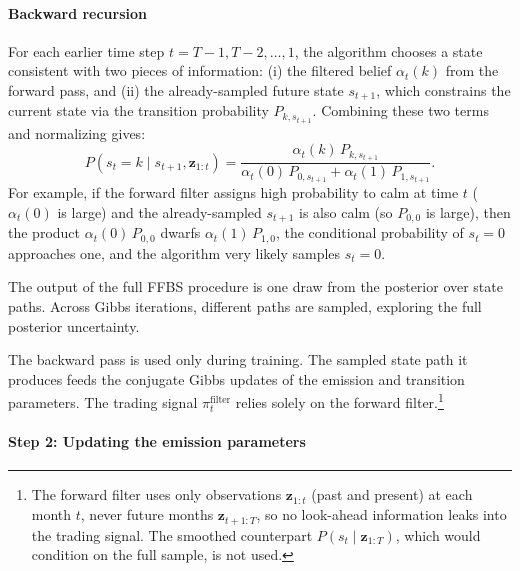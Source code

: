 \paragraph{Backward recursion} For each earlier time step $t = T-1, T-2, \dots, 1$, the algorithm chooses a state consistent with two pieces of information: (i) the filtered belief $\alpha_t(k)$ from the forward pass, and (ii) the already-sampled future state $s_{t+1}$, which constrains the current state via the transition probability $P_{k, s_{t+1}}$. Combining these two terms and normalizing gives:
\begin{equation}
P(s_t = k \mid s_{t+1}, \mathbf{z}_{1:t}) = \frac{\alpha_t(k)\,P_{k,s_{t+1}}}
{\alpha_t(0)\,P_{0,s_{t+1}} + \alpha_t(1)\,P_{1,s_{t+1}}}.
\label{eq:backward_sampling}
\end{equation}
For example, if the forward filter assigns high probability to calm at time $t$ ($\alpha_t(0)$ is large) and the already-sampled $s_{t+1}$ is also calm (so $P_{0,0}$ is large), then the product $\alpha_t(0)\,P_{0,0}$ dwarfs $\alpha_t(1)\,P_{1,0}$, the conditional probability of $s_t = 0$ approaches one, and the algorithm very likely samples $s_t = 0$.

The output of the full FFBS procedure is one draw from the posterior over state paths. Across Gibbs iterations, different paths are sampled, exploring the full posterior uncertainty.

The backward pass is used only during training. The sampled state path it produces feeds the conjugate Gibbs updates of the emission and transition parameters. The trading signal $\pi_t^{\text{filter}}$ relies solely on the forward filter.\footnote{The forward filter uses only observations $\mathbf{z}_{1:t}$ (past and present) at each month $t$, never future months $\mathbf{z}_{t+1:T}$, so no look-ahead information leaks into the trading signal. The smoothed counterpart $P(s_t \mid \mathbf{z}_{1:T})$, which would condition on the full sample, is not used.}

\paragraph{Step 2: Updating the emission parameters}

